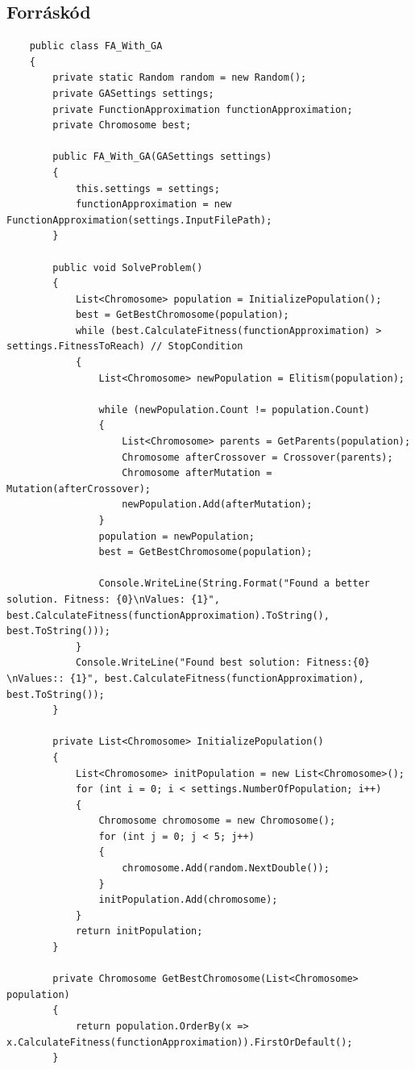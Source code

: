 \documentclass{article}
\begin{document}
\subsection{Forráskód}
  \begin{lstlisting}
    public class FA_With_GA
    {
        private static Random random = new Random();
        private GASettings settings;
        private FunctionApproximation functionApproximation;
        private Chromosome best;

        public FA_With_GA(GASettings settings)
        {
            this.settings = settings;
            functionApproximation = new FunctionApproximation(settings.InputFilePath);
        }

        public void SolveProblem()
        {
            List<Chromosome> population = InitializePopulation();
            best = GetBestChromosome(population);
            while (best.CalculateFitness(functionApproximation) > settings.FitnessToReach) // StopCondition
            {
                List<Chromosome> newPopulation = Elitism(population);

                while (newPopulation.Count != population.Count)
                {
                    List<Chromosome> parents = GetParents(population);
                    Chromosome afterCrossover = Crossover(parents);
                    Chromosome afterMutation = Mutation(afterCrossover);
                    newPopulation.Add(afterMutation);
                }
                population = newPopulation;
                best = GetBestChromosome(population);

                Console.WriteLine(String.Format("Found a better solution. Fitness: {0}\nValues: {1}", best.CalculateFitness(functionApproximation).ToString(), best.ToString()));
            }
            Console.WriteLine("Found best solution: Fitness:{0} \nValues:: {1}", best.CalculateFitness(functionApproximation), best.ToString());
        }

        private List<Chromosome> InitializePopulation()
        {
            List<Chromosome> initPopulation = new List<Chromosome>();
            for (int i = 0; i < settings.NumberOfPopulation; i++)
            {
                Chromosome chromosome = new Chromosome();
                for (int j = 0; j < 5; j++)
                {
                    chromosome.Add(random.NextDouble());
                }
                initPopulation.Add(chromosome);
            }
            return initPopulation;
        }

        private Chromosome GetBestChromosome(List<Chromosome> population)
        {
            return population.OrderBy(x => x.CalculateFitness(functionApproximation)).FirstOrDefault();
        }


\end{lstlisting}
\end{document}
